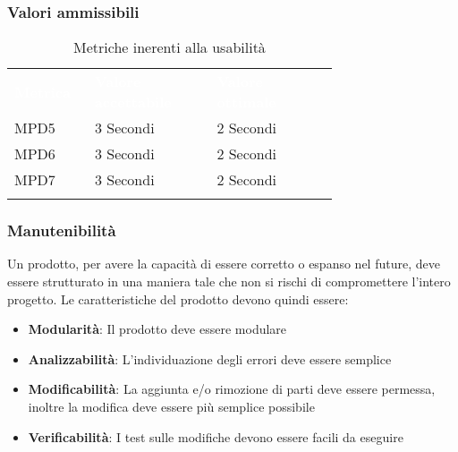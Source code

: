 \subsubsection{Valori ammissibili}
\renewcommand{\arraystretch}{1.5}
\begin{longtable}{p{0.12\linewidth}p{0.30\linewidth}p{0.30\linewidth}}
	\rowcolor[RGB]{33, 73, 50}
	\textcolor{white}{\textbf{Metrica}} & \textcolor{white}{\textbf{Valore accettabile}} & \textcolor{white}{\textbf{Valore ottimale}}\\
    \rowcolor[RGB]{216, 235, 171}
    MPD5 & 3 Secondi & 2 Secondi\\ 
    \rowcolor[RGB]{233, 245, 206}
    MPD6 & 3 Secondi & 2 Secondi\\
    \rowcolor[RGB]{216, 235, 171}
    MPD7 & 3 Secondi & 2 Secondi\\ 
    \caption{Metriche inerenti alla usabilità}
\end{longtable}	
\subsubsection{Manutenibilità}
Un prodotto, per avere la capacità di essere corretto o espanso nel future, deve essere strutturato in una maniera tale che non si rischi di compromettere
l'intero progetto. Le caratteristiche del prodotto devono quindi essere:
\begin{itemize}
    \item \textbf{Modularità}: Il prodotto deve essere modulare
    \item \textbf{Analizzabilità}: L'individuazione degli errori deve essere semplice
    \item \textbf{Modificabilità}: La aggiunta e/o rimozione di parti deve essere permessa, inoltre la modifica deve essere più semplice possibile
    \item \textbf{Verificabilità}: I test sulle modifiche devono essere facili da eseguire
\end{itemize}
